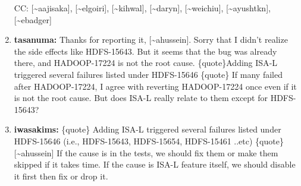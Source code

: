 \documentclass{report}%
\begin{document}
\begin{enumerate}
\newline%
\newline%
\newline%
\newline%
\newline%
CC: {[}\textasciitilde{}aajisaka{]}, {[}\textasciitilde{}elgoiri{]}, {[}\textasciitilde{}kihwal{]}, {[}\textasciitilde{}daryn{]}, {[}\textasciitilde{}weichiu{]}, {[}\textasciitilde{}ayushtkn{]}, {[}\textasciitilde{}ebadger{]}\newline%
\newline%
\newline%
\newline%
\newline%
\newline%
\newline%
\newline%
%
\item%
\textbf{tasanuma: }Thanks for reporting it, {[}\textasciitilde{}ahussein{]}.\newline%
\newline%
\newline%
\newline%
Sorry that I didn't realize the side effects like HDFS{-}15643. But it seems that the bug was already there, and HADOOP{-}17224 is not the root cause.\newline%
\newline%
\{quote\}Adding ISA{-}L triggered several failures listed under HDFS{-}15646\newline%
\newline%
\{quote\}\newline%
\newline%
If many failed after HADOOP{-}17224, I agree with reverting HADOOP{-}17224 once even if it is not the root cause. But does ISA{-}L really relate to them except for HDFS{-}15643?%
\item%
\textbf{iwasakims: }\{quote\}\newline%
\newline%
Adding ISA{-}L triggered several failures listed under HDFS{-}15646 (i.e., HDFS{-}15643, HDFS{-}15654, HDFS{-}15461 ..etc)\newline%
\newline%
\{quote\}\newline%
\newline%
\newline%
\newline%
{[}\textasciitilde{}ahussein{]} If the cause is in the tests, we should fix them or make them skipped if it takes time. If the cause is ISA{-}L feature itself, we should disable it first then fix or drop it.\newline%

\end{enumerate}
\end{document}
